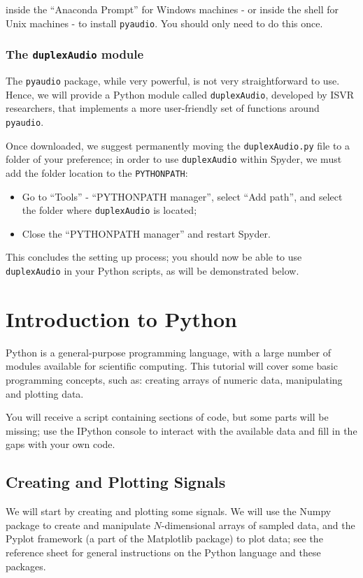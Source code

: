 inside the ``Anaconda Prompt'' for Windows machines - or inside the shell for Unix machines - to install {\tt pyaudio}. You should only need to do this once.

\subsubsection{The {\tt duplexAudio} module}

The {\tt pyaudio} package, while very powerful, is not very straightforward to use. Hence, we will provide a Python module called {\tt duplexAudio}, developed by ISVR researchers, that implements a more user-friendly set of functions around {\tt pyaudio}.

Once downloaded, we suggest permanently moving the {\tt duplexAudio.py} file to a folder of your preference; in order to use {\tt duplexAudio} within Spyder, we must add the folder location to the {\tt PYTHONPATH}:

\begin{itemize}
	\item Go to ``Tools'' - ``PYTHONPATH manager'', select ``Add path'', and select the folder where {\tt duplexAudio} is located;
	\item Close the ``PYTHONPATH manager'' and restart Spyder.
\end{itemize}

This concludes the setting up process; you should now be able to use {\tt duplexAudio} in your Python scripts, as will be demonstrated below.

\section{Introduction to Python}

Python is a general-purpose programming language, with a large number of modules available for scientific computing. This tutorial will cover some basic programming concepts, such as: creating arrays of numeric data, manipulating and plotting data.

You will receive a script containing sections of code, but some parts will be missing; use the IPython console to interact with the available data and fill in the gaps with your own code.

\subsection{Creating and Plotting Signals}

We will start by creating and plotting some signals. We will use the Numpy package to create and manipulate $N$-dimensional arrays of sampled data, and the Pyplot framework (a part of the Matplotlib package) to plot data; see the reference sheet for general instructions on the Python language and these packages.

